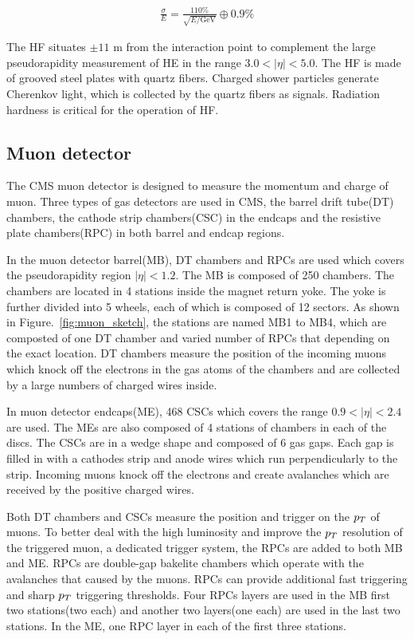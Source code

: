 \begin{align*}
\frac{\sigma}{E}=\frac{110\%}{\sqrt{E/\textrm{GeV}}}\oplus 0.9\%
\end{align*}

The HF situates $\pm11$ m from the interaction point to complement the large pseudorapidity measurement of HE in the range $3.0<|\eta|<5.0$. The HF is made of grooved steel plates with quartz fibers. Charged shower particles generate Cherenkov light, which is collected by the quartz fibers as signals. Radiation hardness is critical for the operation of HF.   



\subsection{Muon detector}
The CMS muon detector is designed to measure the momentum and charge of muon. Three types of gas detectors are used in CMS, the barrel drift tube(DT) chambers, the cathode strip chambers(CSC) in the endcaps and the resistive plate chambers(RPC) in both barrel and endcap regions. 

In the muon detector barrel(MB), DT chambers and RPCs are used which covers the pseudorapidity region $|\eta|<1.2$. The MB is composed of 250 chambers. The chambers are located in 4 stations inside the magnet return yoke. The yoke is further divided into 5 wheels, each of which is composed of 12 sectors. As shown in Figure.~\ref{fig:muon_sketch}, the stations are named MB1 to MB4, which are composted of one DT chamber and varied number of RPCs that depending on the exact location. DT chambers measure the position of the incoming muons which knock off the electrons in the gas atoms of the chambers and are collected by a large numbers of charged wires inside.%

In muon detector endcaps(ME), 468 CSCs which covers the range $0.9<|\eta|<2.4$ are used. The MEs are also composed of 4 stations of chambers in each of the discs. The CSCs are in a wedge shape and composed of 6 gas gaps. Each gap is filled in with a cathodes strip and anode wires which run perpendicularly to the strip. Incoming muons knock off the electrons and create avalanches which are received by the positive charged wires. 

Both DT chambers and CSCs measure the position and trigger on the $p_{T}$ of muons. To better deal with the high luminosity and improve the $p_{T}$ resolution of the triggered muon, a dedicated trigger system, the RPCs are added to both MB and ME. RPCs are double-gap bakelite chambers which operate with the avalanches that caused by the muons. RPCs can provide additional fast triggering and sharp $p_{T}$ triggering thresholds. Four RPCs layers are used in the MB first two stations(two each) and another two layers(one each) are used in the last two stations.  In the ME, one RPC layer in each of the first three stations.    



